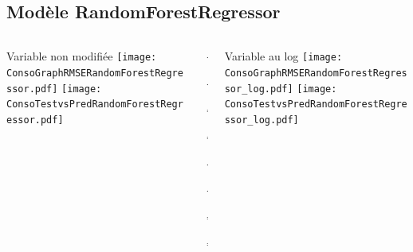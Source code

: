 \documentclass[8pt,aspectratio=169,hyperref={unicode=true}]{beamer}
\begin{document}
\subsection{Modèle RandomForestRegressor}
\begin{frame}{\insertsubsection}
  \begin{columns}[t]
    \begin{column}{.31\textwidth}
      \centering Variable non modifiée
      \texttt{[image: ConsoGraphRMSERandomForestRegressor.pdf]}
      \texttt{[image: ConsoTestvsPredRandomForestRegressor.pdf]}
    \end{column}
    \begin{column}{.38\textwidth}
      $\Longleftarrow$

      {\footnotesize
          }

      $\Longleftarrow$

      \raggedleft
      $\Longrightarrow$

      {\footnotesize
          }

      $\Longrightarrow$

      \vspace{1cm}

      \raggedright
      $\Longleftarrow$
      {\scriptsize
          }

      $\Longleftarrow$

      \raggedleft
      $\Longrightarrow$

      {\scriptsize
          
        }

      $\Longrightarrow$
    \end{column}
    \begin{column}{.31\textwidth}
      \centering Variable au log
      \texttt{[image: ConsoGraphRMSERandomForestRegressor\_log.pdf]}
      \texttt{[image: ConsoTestvsPredRandomForestRegressor\_log.pdf]}
    \end{column}
  \end{columns}
\end{frame}
\end{document}
